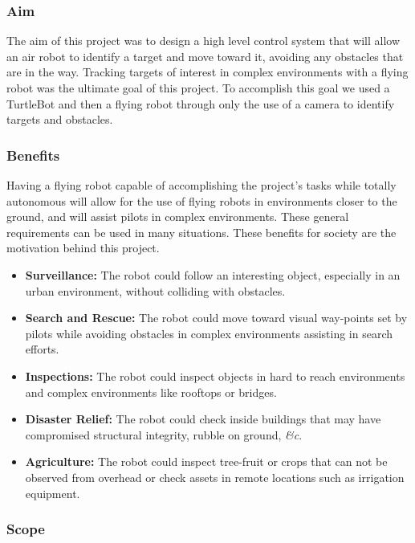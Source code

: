 \documentclass{article}[12]
\begin{document}
		\subsubsection{Aim}
	
		The aim of this project was to design a high level control system that will allow an air robot to identify a target and move toward it, avoiding any obstacles that are in the way. Tracking targets of interest in complex environments with a flying robot was the ultimate goal of this project. To accomplish this goal we used a TurtleBot and then a flying robot through only the use of a camera to identify targets and obstacles. 
		
		\subsubsection{Benefits}
		
		Having a flying robot capable of accomplishing the project's tasks while totally autonomous will allow for the use of flying robots in environments closer to the ground, and will assist pilots in complex environments. These general requirements can be used in many situations. These benefits for society are the motivation behind this project.
		
		\begin{itemize}
			\item \textbf{Surveillance:} The robot could follow an interesting object, especially in an urban environment, without colliding with obstacles.
			\item \textbf{Search and Rescue:} The robot could move toward visual way-points set by pilots while avoiding obstacles in complex environments assisting in search efforts.
			\item \textbf{Inspections:} The robot could inspect objects in hard to reach environments and complex environments like rooftops or bridges.
			\item \textbf{Disaster Relief:} The robot could check inside buildings that may have compromised structural integrity, rubble on ground, \textit{\&c}.
			\item \textbf{Agriculture:} The robot could inspect tree-fruit or crops that can not be observed from overhead or check assets in remote locations such as irrigation equipment.
		\end{itemize}

		\subsubsection{Scope}
	
\end{document}
